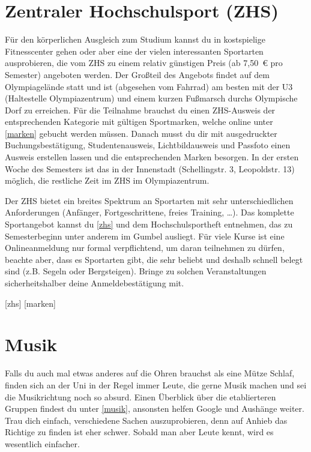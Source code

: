\section{Zentraler Hochschulsport (ZHS)}

Für den körperlichen Ausgleich zum Studium kannst du in kostspielige
Fitnesscenter gehen oder aber eine der vielen interessanten Sportarten
ausprobieren, die vom ZHS zu einem relativ günstigen Preis (ab 7,50~€ pro
Semester) angeboten werden. Der Großteil des Angebots findet auf dem
Olympiagelände statt und ist (abgesehen vom Fahrrad) am besten mit der U3
(Haltestelle Olympiazentrum) und einem kurzen Fußmarsch durchs Olympische Dorf
zu erreichen. Für die Teilnahme brauchst du einen ZHS-Ausweis der
entsprechenden Kategorie mit gültigen Sportmarken, welche online unter
\ref{marken} gebucht werden müssen. Danach musst du dir mit ausgedruckter
Buchungsbestätigung, Studentenausweis, Lichtbildausweis und Passfoto einen
Ausweis erstellen lassen und die entsprechenden Marken besorgen. In der ersten
Woche des Semesters ist das in der Innenstadt (Schellingstr. 3, Leopoldstr. 13)
möglich, die restliche Zeit im ZHS im Olympiazentrum. 

Der ZHS bietet ein breites Spektrum an Sportarten mit sehr unterschiedlichen
Anforderungen (Anfänger, Fortgeschrittene, freies Training, \ldots). Das
komplette Sportangebot kannst du \ref{zhs} und dem Hochschulsportheft
entnehmen, das zu Semesterbeginn unter anderem im Gumbel ausliegt. Für viele
Kurse ist eine Onlineanmeldung nur formal verpflichtend, um daran teilnehmen zu
dürfen, beachte aber, dass es Sportarten gibt, die sehr beliebt und deshalb
schnell belegt sind (z.B. Segeln oder Bergsteigen). Bringe zu solchen
Veranstaltungen sicherheitshalber deine Anmeldebestätigung mit.

\begin{urlList}
	[zhs]
	[marken]
\end{urlList}

\section{Musik}
Falls du auch mal etwas anderes auf die Ohren brauchst als eine
Mütze Schlaf, finden sich an der Uni in der Regel immer Leute, die gerne Musik
machen und sei die Musikrichtung noch so absurd. Einen Überblick über die
etablierteren Gruppen findest du unter \ref{musik}, ansonsten helfen Google und
Aushänge weiter. Trau dich einfach, verschiedene Sachen auszuprobieren, denn
auf Anhieb das Richtige zu finden ist eher schwer. Sobald man aber Leute kennt,
wird es wesentlich einfacher.

